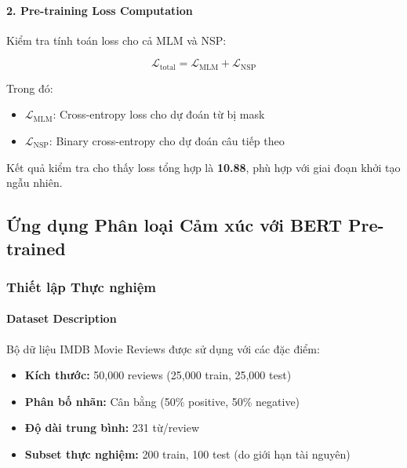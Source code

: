 \paragraph{2. Pre-training Loss Computation}
Kiểm tra tính toán loss cho cả MLM và NSP:

\begin{equation}
\mathcal{L}_{\text{total}} = \mathcal{L}_{\text{MLM}} + \mathcal{L}_{\text{NSP}}
\end{equation}

Trong đó:
\begin{itemize}
    \item $\mathcal{L}_{\text{MLM}}$: Cross-entropy loss cho dự đoán từ bị mask
    \item $\mathcal{L}_{\text{NSP}}$: Binary cross-entropy cho dự đoán câu tiếp theo
\end{itemize}

Kết quả kiểm tra cho thấy loss tổng hợp là \textbf{10.88}, phù hợp với giai đoạn khởi tạo ngẫu nhiên.

\subsection{Ứng dụng Phân loại Cảm xúc với BERT Pre-trained}
\label{ssec:phan_loai_cam_xuc}

\subsubsection{Thiết lập Thực nghiệm}

\paragraph{Dataset Description}
Bộ dữ liệu IMDB Movie Reviews được sử dụng với các đặc điểm:
\begin{itemize}
    \item \textbf{Kích thước:} 50,000 reviews (25,000 train, 25,000 test)
    \item \textbf{Phân bố nhãn:} Cân bằng (50\% positive, 50\% negative)  
    \item \textbf{Độ dài trung bình:} 231 từ/review
    \item \textbf{Subset thực nghiệm:} 200 train, 100 test (do giới hạn tài nguyên)
\end{itemize}

